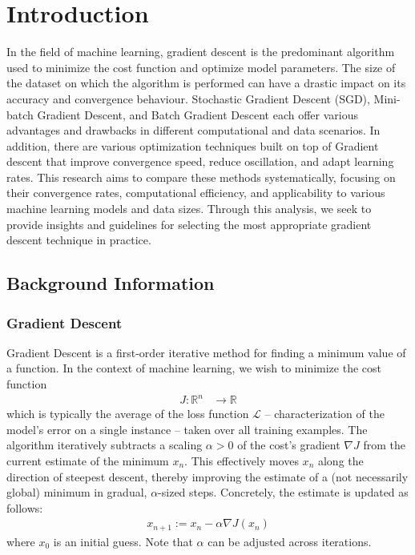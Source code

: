 

\section{Introduction}
In the field of machine learning, gradient descent is the predominant algorithm used to minimize the cost function and optimize model parameters. The size of the dataset on which the algorithm is performed can have a drastic impact on its accuracy and convergence behaviour. Stochastic Gradient Descent (SGD), Mini-batch Gradient Descent, and Batch Gradient Descent each offer various advantages and drawbacks in different computational and data scenarios. In addition, there are various optimization techniques built on top of Gradient descent that improve convergence speed, reduce oscillation, and adapt learning rates. This research aims to compare these methods systematically, focusing on their convergence rates, computational efficiency, and applicability to various machine learning models and data sizes. Through this analysis, we seek to provide insights and guidelines for selecting the most appropriate gradient descent technique in practice.


\subsection{Background Information}
\subsubsection{Gradient Descent}
Gradient Descent is a first-order iterative method for finding a minimum value of a function. In the context of machine learning, we wish to minimize the cost function 
\begin{align*}
    J: \mathbb{R}^n &\rightarrow \mathbb{R}
\end{align*}
which is typically the average of the loss function  $\mathcal{L}$ – characterization of the model's error on a single instance –
taken over all training examples. The algorithm iteratively subtracts a scaling \(\alpha > 0\) of the cost's gradient \( \nabla J \) from the current estimate of the minimum \( x_n \). This effectively moves \( x_n \) along the direction of steepest descent, thereby improving the estimate of a (not necessarily global) minimum in gradual, \(\alpha\)-sized steps. Concretely, the estimate is updated as follows: 
\begin{align*}
    x_{n+1} := x_n - \alpha \nabla J(x_n)
    \tag{1}
\end{align*} 
where $x_0$ is an initial guess. Note that $\alpha$ can be adjusted across iterations.

